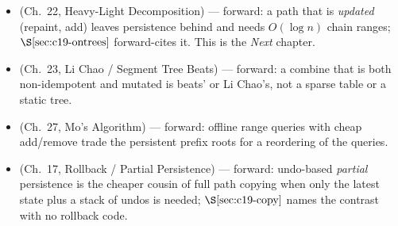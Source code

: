 \begin{itemize}[nosep, leftmargin=1.4em]
  \item {} (Ch.~22, Heavy-Light Decomposition) --- forward: a path that is \emph{updated}
        (repaint, add) leaves persistence behind and needs \(O(\log n)\) chain ranges;
        \(\secref{c19-ontrees}\) forward-cites it. This is the \emph{Next} chapter.
  \item {} (Ch.~23, Li Chao / Segment Tree Beats) --- forward: a combine that is both
        non-idempotent and mutated is beats' or Li Chao's, not a sparse table or a static tree.
  \item {} (Ch.~27, Mo's Algorithm) --- forward: offline range queries with cheap
        add/remove trade the persistent prefix roots for a reordering of the queries.
  \item {} (Ch.~17, Rollback / Partial Persistence) --- forward: undo-based \emph{partial}
        persistence is the cheaper cousin of full path copying when only the latest state plus a
        stack of undos is needed; \(\secref{c19-copy}\) names the contrast with no rollback code.
\end{itemize}


